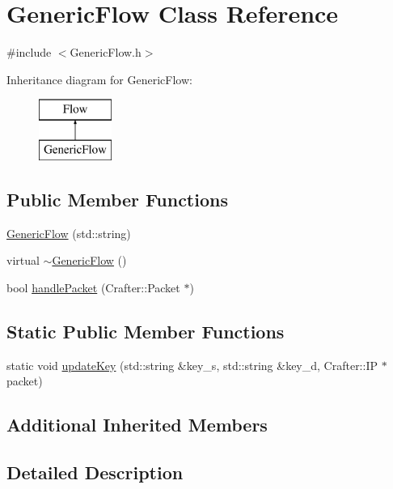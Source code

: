 \hypertarget{class_generic_flow}{}\section{Generic\+Flow Class Reference}
\label{class_generic_flow}


{\ttfamily \#include $<$Generic\+Flow.\+h$>$}

Inheritance diagram for Generic\+Flow\+:\begin{figure}[H]
\begin{center}
\leavevmode
\includegraphics[height=2.000000cm]{class_generic_flow}
\end{center}
\end{figure}
\subsection*{Public Member Functions}
\begin{DoxyCompactItemize}
\item 
\hyperlink{class_generic_flow_a64cffa198c737d3e5fd3da43d6a6a0af}{Generic\+Flow} (std\+::string)
\item 
virtual \hyperlink{class_generic_flow_ae2d0e2664aa8c7196450093be73ae61a}{$\sim$\+Generic\+Flow} ()
\item 
bool \hyperlink{class_generic_flow_a5c859935f4af3f4fd2754be1c31086c8}{handle\+Packet} (Crafter\+::\+Packet $\ast$)
\end{DoxyCompactItemize}
\subsection*{Static Public Member Functions}
\begin{DoxyCompactItemize}
\item 
static void \hyperlink{class_generic_flow_a6963b91b082157c84ef967e7aa6a2fab}{update\+Key} (std\+::string \&key\+\_\+s, std\+::string \&key\+\_\+d, Crafter\+::\+IP $\ast$packet)
\end{DoxyCompactItemize}
\subsection*{Additional Inherited Members}


\subsection{Detailed Description}


